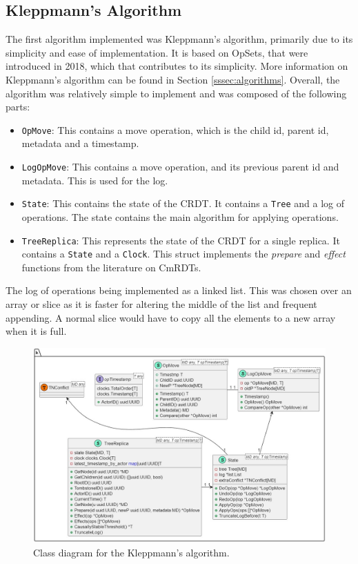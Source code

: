 \documentclass[12pt]{report}
\begin{document}
\subsection{Kleppmann's Algorithm}
The first algorithm implemented was Kleppmann's algorithm, primarily due to its simplicity and ease of implementation. It is based on OpSets, that were introduced in 2018\cite{https://doi.org/10.48550/arxiv.1805.04263}, which that contributes to its simplicity. More information on Kleppmann's algorithm can be found in Section \ref{sssec:algorithms}. Overall, the algorithm was relatively simple to implement and was composed of the following parts:
\begin{itemize}
    \item \texttt{OpMove}: This contains a move operation, which is the child id, parent id, metadata and a timestamp.
    \item \texttt{LogOpMove}: This contains a move operation, and its previous parent id and metadata. This is used for the log.
    \item \texttt{State}: This contains the state of the CRDT. It contains a \texttt{Tree} and a log of operations. The state contains the main algorithm for applying operations.
    \item \texttt{TreeReplica}: This represents the state of the CRDT for a single replica. It contains a \texttt{State} and a \texttt{Clock}. This struct implements the \textit{prepare} and \textit{effect} functions from the literature on CmRDTs.
\end{itemize}

The log of operations being implemented as a linked list. This was chosen over an array or slice as it is faster for altering the middle of the list and frequent appending. A normal slice would have to copy all the elements to a new array when it is full. \par

\begin{figure}[H]
    \centering
    \includegraphics[width=1\textwidth]{images/kleppmann_impl2.jpg} 
    \caption{Class diagram for the Kleppmann's algorithm.}
    \label{fig:kleppmann_impl} 
\end{figure} 
\end{document}
